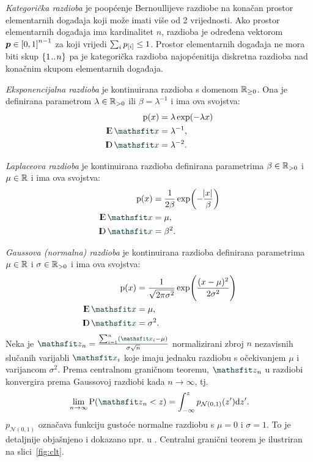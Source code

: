 \documentclass[utf8, diplomski, lmodern]{fer}
\begin{document}
\emph{Kategorička razdioba} je poopćenje Bernoullijeve razdiobe na konačan prostor elementarnih događaja koji može imati više od 2 vrijednosti. Ako prostor elementarnih događaja ima kardinalitet $n$, razdioba je određena vektorom $\vec p\in\intcc{0,1}^{n-1}$ za koji vrijedi $\sum_i p_{\sbr{i}}\leq 1$. Prostor elementarnih događaja ne mora biti skup $\cbr{1\bidot n}$ pa je kategorička razdioba najopćenitija diskretna razdioba nad konačnim skupom elementarnih događaja.

\emph{Eksponencijalna razdioba} je kontinuirana razdioba s domenom $\mathbb{R}_{\geq0}$. Ona je definirana parametrom $\lambda\in\mathbb{R}_{>0}$ ili $\beta=\lambda^{-1}$ i ima ova svojstva:
\begin{align}
\p(x) &= \lambda\exp(-\lambda x) \\
\E \rvar x &= \lambda^{-1}, \\
\D \rvar x &= \lambda^{-2} \text{.}
\end{align}

\emph{Laplaceova razdioba} je kontinuirana razdioba definirana parametrima $\beta\in\mathbb{R}_{>0}$ i $\mu \in \mathbb{R}$ i ima ova svojstva:
\begin{align}
\p(x) &= \frac{1}{2\beta}\exp\del{-\frac{\envert{x}}{\beta}} \\
\E \rvar x &= \mu, \\
\D \rvar x &= \beta^2 \text{.}
\end{align}

\emph{Gaussova (normalna) razdioba} je kontinuirana razdioba definirana parametrima $\mu\in\mathbb{R}$ i $\sigma \in \mathbb{R}_{>0}$ i ima ova svojstva:
\begin{align}
\p(x) &= \frac{1}{\sqrt{2\pi\sigma^2}}\exp\del{\frac{\del{x-\mu}^2}{2\sigma^2}} \\
\E \rvar x &= \mu, \\
\D \rvar x &= \sigma^2 \text{.}
\end{align}
Neka je $\rvar z_n = \frac{\sum_{i=1}^n \del{\rvar x_i-\mu}}{\sigma\sqrt{n}}$ normalizirani zbroj $n$ nezavisnih slučanih varijabli $\rvar x_i$ koje imaju jednaku razdiobu s očekivanjem $\mu$ i varijancom $\sigma^2$. Prema centralnom graničnom teoremu, $\rvar z_n$ u razdiobi konvergira prema Gaussovoj razdiobi kada $n\to\infty$, tj.
\begin{align}
\lim_{n\to\infty} \P(\rvar z_n<z) = \int_{-\infty}^{z} p_{\mathcal{N}(0,1)}(z')\dif{z'} \text{.}
\end{align}
$p_{\mathcal{N}(0,1)}$ označava funkciju gustoće normalne razdiobu s $\mu=0$ i $\sigma=1$. To je detaljnije objašnjeno i dokazano npr. u \citep{Elezovic:2007:VSSV}. Centralni granični teorem je ilustriran na slici~\ref{fig:clt}.
\end{document}

